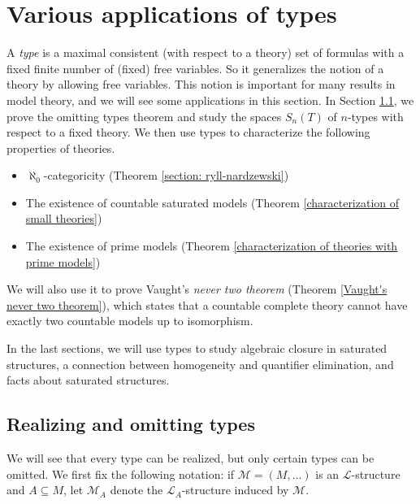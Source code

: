 \documentclass[10pt]{amsart}
\renewcommand{\L}{\mathcal{L}}
\newcommand{\MM}{\mathcal{M}}
\theoremstyle{definition}
\theoremstyle{remark}
\begin{document}
\section{Various applications of types}

A \emph{type} is a maximal consistent (with respect to a theory) set of formulas with a fixed finite number of (fixed) free variables. So it generalizes the notion of a theory by allowing free variables. This notion is important for many results in model theory, and we will see some applications in this section. In Section \ref{section: realizing and omitting types}, we prove the omitting types theorem and study the spaces $S_n(T)$ of $n$-types with respect to a fixed theory. We then use types to characterize the following properties of theories. 

\begin{itemize} 
\item 
$\aleph_0$-categoricity (Theorem \ref{section: ryll-nardzewski}) 
\item 
The existence of countable saturated models (Theorem \ref{characterization of small theories}) 
\item 
The existence of prime models (Theorem \ref{characterization of theories with prime models}) 
\end{itemize} 

We will also use it to prove Vaught's \emph{never two theorem} (Theorem \ref{Vaught's never two theorem}), which states that a countable complete theory cannot have exactly two countable models up to isomorphism. 

In the last sections, we will use types to study algebraic closure in saturated structures, a connection between homogeneity and quantifier elimination, and facts about saturated structures. 



\subsection{Realizing and omitting types} \label{section: realizing and omitting types} 

We will see that every type can be realized, but only certain types can be omitted. 
We first fix the following notation: if $\MM=(M,\dots)$ is an $\L$-structure and $A\subseteq M$, let $\MM_A$ denote the $\L_A$-structure induced by $\MM$. 
\end{document}
